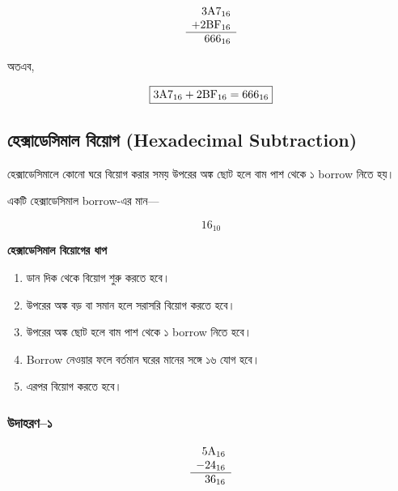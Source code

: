 \[
\begin{array}{r}
3\text{\textenglish{A}}7_{16}\\
+2\text{\textenglish{BF}}_{16}\\
\hline
666_{16}
\end{array}
\]

অতএব,

\[
\boxed{
3\text{\textenglish{A}}7_{16}
+
2\text{\textenglish{BF}}_{16}
=
666_{16}
}
\]


\subsection{হেক্সাডেসিমাল বিয়োগ
(\textenglish{Hexadecimal Subtraction})}

হেক্সাডেসিমালে কোনো ঘরে বিয়োগ করার সময়
উপরের অঙ্ক ছোট হলে বাম পাশ থেকে
১ \textenglish{borrow} নিতে হয়।

একটি হেক্সাডেসিমাল
\textenglish{borrow}-এর মান—

\[
16_{10}
\]

\par\begingroup

\textbf{হেক্সাডেসিমাল বিয়োগের ধাপ}

\begin{enumerate}
    \item ডান দিক থেকে বিয়োগ শুরু করতে হবে।
    \item উপরের অঙ্ক বড় বা সমান হলে সরাসরি বিয়োগ করতে হবে।
    \item উপরের অঙ্ক ছোট হলে বাম পাশ থেকে
    ১ \textenglish{borrow} নিতে হবে।
    \item \textenglish{Borrow} নেওয়ার ফলে বর্তমান ঘরের
    মানের সঙ্গে ১৬ যোগ হবে।
    \item এরপর বিয়োগ করতে হবে।
\end{enumerate}
\par\endgroup


\subsubsection*{উদাহরণ--১}

\[
\begin{array}{r}
5\text{\textenglish{A}}_{16}\\
-24_{16}\\
\hline
36_{16}
\end{array}
\]

